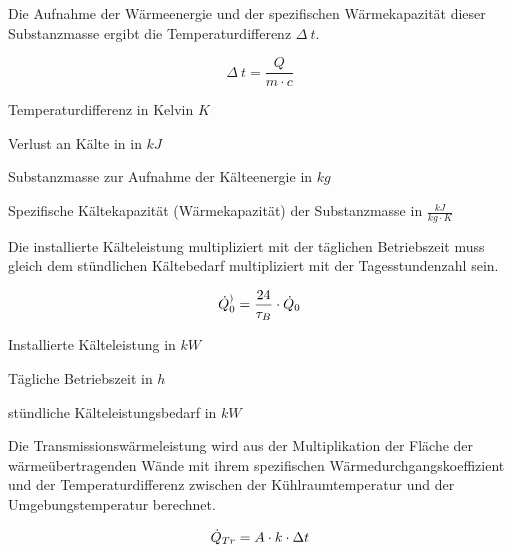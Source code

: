 Die Aufnahme der Wärmeenergie und der spezifischen Wärmekapazität dieser
Substanzmasse ergibt die Temperaturdifferenz $\Delta\:t$.

\begin{equation}
	\Delta\:t = \frac{Q}{m\cdot c}
\label{tdif}
\end{equation}

\begin{description}[\dth]

	\item[$\Delta\:t$] Temperaturdifferenz in Kelvin $K$
	\item[$Q$] Verlust an K\"alte in in $kJ$
	\item[$m$] Substanzmasse zur Aufnahme der K\"alteenergie in $kg$
	\item[$c$] Spezifische K\"altekapazit\"at (W\"armekapazit\"at) der
	Substanzmasse in $\frac{kJ}{kg \cdot K}$

\end{description}
\vspace{0.5cm}

Die installierte Kälteleistung multipliziert mit der täglichen Betriebszeit muss
gleich dem stündlichen K\"altebedarf multipliziert mit der Tagesstundenzahl
sein.

\begin{equation}
	\pinstall = \frac{24}{ \tau_{B} }  \cdot \pkalt \label{pinstall}
\end{equation}

\begin{description}[\dth]

	\item[$\pinstall$] Installierte Kälteleistung in $kW$
	\item[$\tau_{B}$] Tägliche Betriebszeit in $h$
	\item[$\pkalt$] st\"undliche Kälteleistungsbedarf in $kW$

\end{description}
\vspace{0.5cm}

Die Transmissionswärmeleistung wird aus der Multiplikation der Fläche
der wärmeübertragenden Wände mit ihrem spezifischen Wärmedurchgangskoeffizient
und der Temperaturdifferenz zwischen der Kühlraumtemperatur und der
Umgebungstemperatur berechnet.

\begin{equation}
	\ptrans = A \cdot k \cdot \Delta t
	\label{ptrans}
\end{equation}

